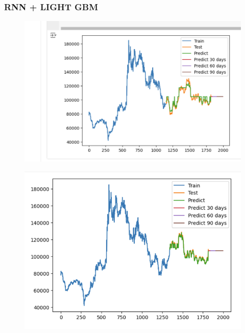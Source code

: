 \documentclass[conference]{IEEEtran}
\begin{document}
\subsubsection{RNN + LIGHT GBM}
\begin{figure}[H]
    \centering
    \begin{minipage}{0.15\textwidth}
    \centering
    \includegraphics[width=1\textwidth]{Image/Light GBM/LightGBM_LG_6_4.png}
   
    \label{fig:1}
    \end{minipage}%
    \begin{minipage}{0.15\textwidth}
    \centering
    \includegraphics[width=1\textwidth]{Image/Light GBM/LightGBM_LG_7_3.png}
  

\end{minipage}
\end{figure}
\end{document}
